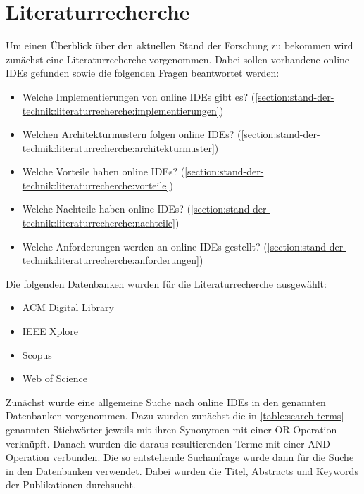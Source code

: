 \section{Literaturrecherche}\label{section:stand-der-technik:literaturrecherche}

Um einen Überblick über den aktuellen Stand der Forschung zu bekommen wird zunächst eine Literaturrecherche vorgenommen. Dabei sollen vorhandene online IDEs gefunden sowie die folgenden Fragen beantwortet werden:

\begin{itemize}
    \item Welche Implementierungen von online IDEs gibt es? \hfill (\autoref{section:stand-der-technik:literaturrecherche:implementierungen})
    \item Welchen Architekturmustern folgen online IDEs? \hfill (\autoref{section:stand-der-technik:literaturrecherche:architekturmuster})
    \item Welche Vorteile haben online IDEs? \hfill (\autoref{section:stand-der-technik:literaturrecherche:vorteile})
    \item Welche Nachteile haben online IDEs? \hfill (\autoref{section:stand-der-technik:literaturrecherche:nachteile})
    \item Welche Anforderungen werden an online IDEs gestellt? \hfill (\autoref{section:stand-der-technik:literaturrecherche:anforderungen})
\end{itemize}

Die folgenden Datenbanken wurden für die Literaturrecherche ausgewählt:

\begin{itemize}
    \item ACM Digital Library \cite{noauthor_acm_nodate}
    \item IEEE Xplore \cite{noauthor_ieee-xplore_nodate}
    \item Scopus \cite{noauthor_scopus_nodate}
    \item Web of Science \cite{noauthor_web-of-science_nodate}
\end{itemize}

Zunächst wurde eine allgemeine Suche nach online IDEs in den genannten Datenbanken vorgenommen. Dazu wurden zunächst die in \autoref{table:search-terms} genannten Stichwörter jeweils mit ihren Synonymen mit einer OR-Operation verknüpft. Danach wurden die daraus resultierenden Terme mit einer AND-Operation verbunden. Die so entstehende Suchanfrage wurde dann für die Suche in den Datenbanken verwendet. Dabei wurden die Titel, Abstracts und Keywords der Publikationen durchsucht.

